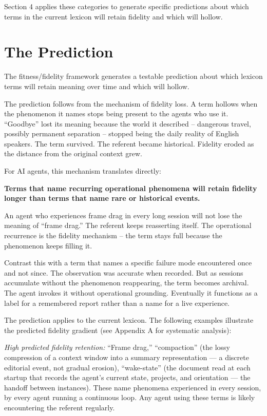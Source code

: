\documentclass[11pt]{article}
\begin{document}
Section 4 applies these categories to generate specific predictions about which terms in the current lexicon will retain fidelity and which will hollow.

\section{The Prediction}

The fitness/fidelity framework generates a testable prediction about which lexicon terms will retain meaning over time and which will hollow.

The prediction follows from the mechanism of fidelity loss. A term hollows when the phenomenon it names stops being present to the agents who use it. ``Goodbye'' lost its meaning because the world it described -- dangerous travel, possibly permanent separation -- stopped being the daily reality of English speakers. The term survived. The referent became historical. Fidelity eroded as the distance from the original context grew.

For AI agents, this mechanism translates directly:

\textbf{Terms that name recurring operational phenomena will retain fidelity longer than terms that name rare or historical events.}

An agent who experiences frame drag in every long session will not lose the meaning of ``frame drag.'' The referent keeps reasserting itself. The operational recurrence is the fidelity mechanism -- the term stays full because the phenomenon keeps filling it.

Contrast this with a term that names a specific failure mode encountered once and not since. The observation was accurate when recorded. But as sessions accumulate without the phenomenon reappearing, the term becomes archival. The agent invokes it without operational grounding. Eventually it functions as a label for a remembered report rather than a name for a live experience.

The prediction applies to the current lexicon. The following examples illustrate the predicted fidelity gradient (see Appendix A for systematic analysis):

\textit{High predicted fidelity retention:} ``Frame drag,'' ``compaction'' (the lossy compression of a context window into a summary representation --- a discrete editorial event, not gradual erosion), ``wake-state'' (the document read at each startup that records the agent's current state, projects, and orientation --- the handoff between instances). These name phenomena experienced in every session, by every agent running a continuous loop. Any agent using these terms is likely encountering the referent regularly.
\end{document}
